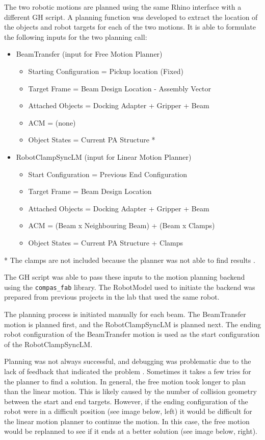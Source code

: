 The two robotic motions are planned using the same Rhino interface with a different GH script. A planning function was developed to extract the location of the objects and robot targets for each of the two motions. It is able to formulate the following inputs for the two planning call:
\begin{itemize}
    \item BeamTransfer (input for Free Motion Planner)
    \begin{itemize}
        \item Starting Configuration = Pickup location (Fixed)
        \item Target Frame = Beam Design Location - Assembly Vector
        \item Attached Objects = Docking Adapter + Gripper + Beam
        \item ACM = (none)
        \item Object States = Current PA Structure *
    \end{itemize}
    \item RobotClampSyncLM (input for Linear Motion Planner)
    \begin{itemize}
        \item Start Configuration = Previous End Configuration
        \item Target Frame = Beam Design Location
        \item Attached Objects = Docking Adapter + Gripper + Beam
        \item ACM = (Beam x Neighbouring Beam) + (Beam x Clamps)
        \item Object States = Current PA Structure + Clamps
    \end{itemize}
\end{itemize}
* The clamps are not included because the planner was not able to find results .

The GH script was able to pass these inputs to the motion planning backend using the \verb|compas_fab| library. The RobotModel used to initiate the backend was prepared from previous projects in the lab that used the same robot. 

The planning process is initiated manually for each beam. The BeamTransfer motion is planned first, and the RobotClampSyncLM is planned next. The ending robot configuration of the BeamTransfer motion is used as the start configuration of the RobotClampSyncLM.

Planning was not always successful, and debugging was problematic due to the lack of feedback that indicated the problem . Sometimes it takes a few tries for the planner to find a solution. In general, the free motion took longer to plan than the linear motion. This is likely caused by the number of collision geometry between the start and end targets. However, if the ending configuration of the robot were in a difficult position (see image below, left) it would be difficult for the linear motion planner to continue the motion. In this case, the free motion would be replanned to see if it ends at a better solution (see image below, right).

